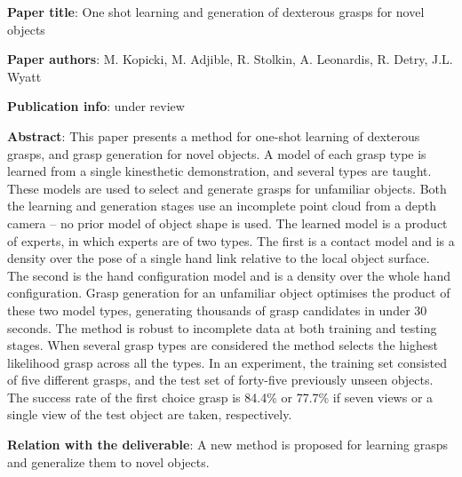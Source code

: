 
\item
\begin{list}{\quad}{}
\item \textbf{Paper title}: One shot learning and generation of dexterous grasps for novel objects
\item \textbf{Paper authors}: M. Kopicki, M. Adjible, R. Stolkin, A. Leonardis, R. Detry, J.L. Wyatt
\item\textbf{Publication info}: under review
\item\textbf{Abstract}: 
This paper presents a method for one-shot learning of dexterous grasps, and grasp generation for novel objects. A model
of each grasp type is learned from a single kinesthetic demonstration, and several types are taught. These models are used
to select and generate grasps for unfamiliar objects. Both the learning and generation stages use an incomplete point cloud
from a depth camera – no prior model of object shape is used. The learned model is a product of experts, in which experts
are of two types. The first is a contact model and is a density over the pose of a single hand link relative to the local object
surface. The second is the hand configuration model and is a density over the whole hand configuration. Grasp generation
for an unfamiliar object optimises the product of these two model types, generating thousands of grasp candidates in under
30 seconds. The method is robust to incomplete data at both training and testing stages. When several grasp types are
considered the method selects the highest likelihood grasp across all the types. In an experiment, the training set consisted
of five different grasps, and the test set of forty-five previously unseen objects. The success rate of the first choice grasp is
84.4\% or 77.7\% if seven views or a single view of the test object are taken, respectively.


\item \textbf{Relation with the deliverable}: A new method is proposed for learning grasps and generalize them to novel objects.
\end{list}